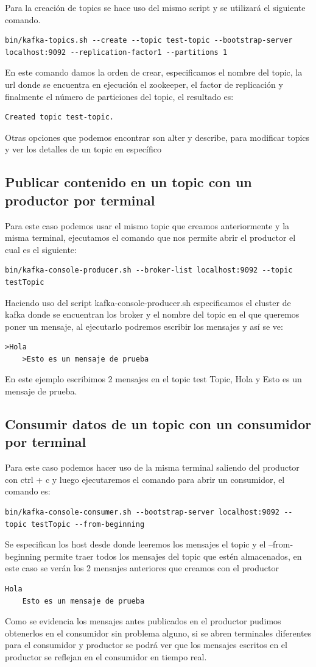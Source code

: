 \documentclass{article}
\begin{document}
Para la creación de topics se hace uso del mismo script y se utilizará el siguiente comando.\\
{\tiny 
\begin{lstlisting}[numbers=none]
        bin/kafka-topics.sh --create --topic test-topic --bootstrap-server localhost:9092 --replication-factor1 --partitions 1\end{lstlisting} }
En este comando damos la orden de crear, especificamos el nombre del topic, la url donde se encuentra en ejecución el zookeeper, el factor de replicación y finalmente el número de particiones del topic, el resultado es:
\begin{lstlisting}[numbers=none]
    Created topic test-topic.\end{lstlisting}
Otras opciones que podemos encontrar son alter y describe, para modificar topics y ver los detalles de un topic en específico
\subsection{Publicar contenido en un topic con un productor por terminal}
Para este caso podemos usar el mismo topic que creamos anteriormente y la misma terminal, ejecutamos el comando que nos permite abrir el productor el cual es el siguiente:
\begin{lstlisting}[numbers=none]
    bin/kafka-console-producer.sh --broker-list localhost:9092 --topic testTopic\end{lstlisting}
Haciendo uso del script kafka-console-producer.sh especificamos el cluster de kafka donde se encuentran los broker y el nombre del topic en el que queremos poner un mensaje, al ejecutarlo podremos escribir los mensajes y así se ve:
\begin{lstlisting}[numbers=none]
    >Hola
    >Esto es un mensaje de prueba\end{lstlisting}
En este ejemplo escribimos 2 mensajes en el topic test Topic, Hola y Esto es un mensaje de prueba.
\subsection{Consumir datos de un topic con un consumidor por terminal}
Para este caso podemos hacer uso de la misma terminal saliendo del productor con ctrl + c y luego ejecutaremos el comando para abrir un consumidor, el comando es:
\begin{lstlisting}[numbers=none]
    bin/kafka-console-consumer.sh --bootstrap-server localhost:9092 --topic testTopic --from-beginning\end{lstlisting}
Se especifican los host desde donde leeremos los mensajes el topic y el --from-beginning permite traer todos los mensajes del topic que estén almacenados, en este caso se verán los 2 mensajes anteriores que creamos con el productor
\begin{lstlisting}[numbers=none]
    Hola
    Esto es un mensaje de prueba\end{lstlisting}
Como se evidencia los mensajes antes publicados en el productor pudimos obtenerlos en el consumidor sin problema alguno, si se abren terminales diferentes para el consumidor y productor se podrá ver que los mensajes escritos en el productor se reflejan en el consumidor en tiempo real.
\end{document}
